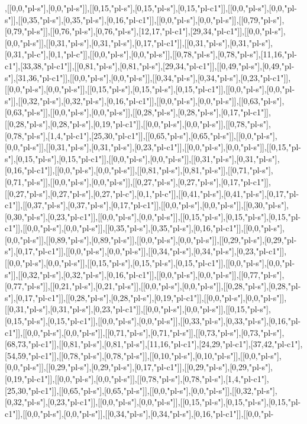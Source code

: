 ,[[0,0,"pl-s"],[0,0,"pl-s"]],[[0,15,"pl-s"],[0,15,"pl-s"],[0,15,"pl-c1"]],[[0,0,"pl-s"],[0,0,"pl-s"]],[[0,35,"pl-s"],[0,35,"pl-s"],[0,16,"pl-c1"]],[[0,0,"pl-s"],[0,0,"pl-s"]],[[0,79,"pl-s"],[0,79,"pl-s"]],[[0,76,"pl-s"],[0,76,"pl-s"],[12,17,"pl-c1"],[29,34,"pl-c1"]],[[0,0,"pl-s"],[0,0,"pl-s"]],[[0,31,"pl-s"],[0,31,"pl-s"],[0,17,"pl-c1"]],[[0,31,"pl-s"],[0,31,"pl-s"],[0,31,"pl-c"],[0,1,"pl-c"]],[[0,0,"pl-s"],[0,0,"pl-s"]],[[0,78,"pl-s"],[0,78,"pl-s"],[11,16,"pl-c1"],[33,38,"pl-c1"]],[[0,81,"pl-s"],[0,81,"pl-s"],[29,34,"pl-c1"]],[[0,49,"pl-s"],[0,49,"pl-s"],[31,36,"pl-c1"]],[[0,0,"pl-s"],[0,0,"pl-s"]],[[0,34,"pl-s"],[0,34,"pl-s"],[0,23,"pl-c1"]],[[0,0,"pl-s"],[0,0,"pl-s"]],[[0,15,"pl-s"],[0,15,"pl-s"],[0,15,"pl-c1"]],[[0,0,"pl-s"],[0,0,"pl-s"]],[[0,32,"pl-s"],[0,32,"pl-s"],[0,16,"pl-c1"]],[[0,0,"pl-s"],[0,0,"pl-s"]],[[0,63,"pl-s"],[0,63,"pl-s"]],[[0,0,"pl-s"],[0,0,"pl-s"]],[[0,28,"pl-s"],[0,28,"pl-s"],[0,17,"pl-c1"]],[[0,28,"pl-s"],[0,28,"pl-s"],[0,19,"pl-c1"]],[[0,0,"pl-s"],[0,0,"pl-s"]],[[0,78,"pl-s"],[0,78,"pl-s"],[1,4,"pl-c1"],[25,30,"pl-c1"]],[[0,65,"pl-s"],[0,65,"pl-s"]],[[0,0,"pl-s"],[0,0,"pl-s"]],[[0,31,"pl-s"],[0,31,"pl-s"],[0,23,"pl-c1"]],[[0,0,"pl-s"],[0,0,"pl-s"]],[[0,15,"pl-s"],[0,15,"pl-s"],[0,15,"pl-c1"]],[[0,0,"pl-s"],[0,0,"pl-s"]],[[0,31,"pl-s"],[0,31,"pl-s"],[0,16,"pl-c1"]],[[0,0,"pl-s"],[0,0,"pl-s"]],[[0,81,"pl-s"],[0,81,"pl-s"]],[[0,71,"pl-s"],[0,71,"pl-s"]],[[0,0,"pl-s"],[0,0,"pl-s"]],[[0,27,"pl-s"],[0,27,"pl-s"],[0,17,"pl-c1"]],[[0,27,"pl-s"],[0,27,"pl-s"],[0,27,"pl-c"],[0,1,"pl-c"]],[[0,41,"pl-s"],[0,41,"pl-s"],[0,17,"pl-c1"]],[[0,37,"pl-s"],[0,37,"pl-s"],[0,17,"pl-c1"]],[[0,0,"pl-s"],[0,0,"pl-s"]],[[0,30,"pl-s"],[0,30,"pl-s"],[0,23,"pl-c1"]],[[0,0,"pl-s"],[0,0,"pl-s"]],[[0,15,"pl-s"],[0,15,"pl-s"],[0,15,"pl-c1"]],[[0,0,"pl-s"],[0,0,"pl-s"]],[[0,35,"pl-s"],[0,35,"pl-s"],[0,16,"pl-c1"]],[[0,0,"pl-s"],[0,0,"pl-s"]],[[0,89,"pl-s"],[0,89,"pl-s"]],[[0,0,"pl-s"],[0,0,"pl-s"]],[[0,29,"pl-s"],[0,29,"pl-s"],[0,17,"pl-c1"]],[[0,0,"pl-s"],[0,0,"pl-s"]],[[0,34,"pl-s"],[0,34,"pl-s"],[0,23,"pl-c1"]],[[0,0,"pl-s"],[0,0,"pl-s"]],[[0,15,"pl-s"],[0,15,"pl-s"],[0,15,"pl-c1"]],[[0,0,"pl-s"],[0,0,"pl-s"]],[[0,32,"pl-s"],[0,32,"pl-s"],[0,16,"pl-c1"]],[[0,0,"pl-s"],[0,0,"pl-s"]],[[0,77,"pl-s"],[0,77,"pl-s"]],[[0,21,"pl-s"],[0,21,"pl-s"]],[[0,0,"pl-s"],[0,0,"pl-s"]],[[0,28,"pl-s"],[0,28,"pl-s"],[0,17,"pl-c1"]],[[0,28,"pl-s"],[0,28,"pl-s"],[0,19,"pl-c1"]],[[0,0,"pl-s"],[0,0,"pl-s"]],[[0,31,"pl-s"],[0,31,"pl-s"],[0,23,"pl-c1"]],[[0,0,"pl-s"],[0,0,"pl-s"]],[[0,15,"pl-s"],[0,15,"pl-s"],[0,15,"pl-c1"]],[[0,0,"pl-s"],[0,0,"pl-s"]],[[0,33,"pl-s"],[0,33,"pl-s"],[0,16,"pl-c1"]],[[0,0,"pl-s"],[0,0,"pl-s"]],[[0,71,"pl-s"],[0,71,"pl-s"]],[[0,73,"pl-s"],[0,73,"pl-s"],[68,73,"pl-c1"]],[[0,81,"pl-s"],[0,81,"pl-s"],[11,16,"pl-c1"],[24,29,"pl-c1"],[37,42,"pl-c1"],[54,59,"pl-c1"]],[[0,78,"pl-s"],[0,78,"pl-s"]],[[0,10,"pl-s"],[0,10,"pl-s"]],[[0,0,"pl-s"],[0,0,"pl-s"]],[[0,29,"pl-s"],[0,29,"pl-s"],[0,17,"pl-c1"]],[[0,29,"pl-s"],[0,29,"pl-s"],[0,19,"pl-c1"]],[[0,0,"pl-s"],[0,0,"pl-s"]],[[0,78,"pl-s"],[0,78,"pl-s"],[1,4,"pl-c1"],[25,30,"pl-c1"]],[[0,65,"pl-s"],[0,65,"pl-s"]],[[0,0,"pl-s"],[0,0,"pl-s"]],[[0,32,"pl-s"],[0,32,"pl-s"],[0,23,"pl-c1"]],[[0,0,"pl-s"],[0,0,"pl-s"]],[[0,15,"pl-s"],[0,15,"pl-s"],[0,15,"pl-c1"]],[[0,0,"pl-s"],[0,0,"pl-s"]],[[0,34,"pl-s"],[0,34,"pl-s"],[0,16,"pl-c1"]],[[0,0,"pl-